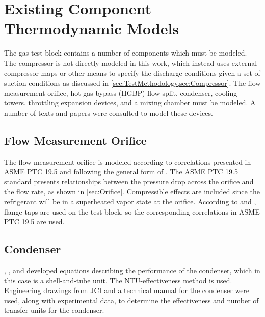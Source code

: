 
\section{Existing Component Thermodynamic Models}
The  gas test block contains a number of components which must be modeled. 
The compressor is not directly modeled in this work, 
which instead uses external compressor maps or other means 
to specify the discharge conditions given a set of suction conditions
as discussed in \cref{sec:TestMethodology,sec:Compressor}. 
The flow measurement orifice, hot gas bypass (HGBP) flow split, condenser, cooling towers, 
throttling expansion devices, and a mixing chamber must be modeled. 
A number of texts and papers were consulted to model these devices.

\subsection{Flow Measurement Orifice}
The flow measurement orifice is modeled according to correlations presented in 
ASME PTC 19.5 \citep{ptc19} and following the general form of \citet{munson2009}. 
The ASME PTC 19.5 standard presents relationships between 
the pressure drop across the orifice and the flow rate, as shown in \cref{sec:Orifice}. 
Compressible effects are included since the refrigerant will be in a 
superheated vapor state at the orifice.
According to \citet{trevino2012} and \citet{flow1984}, flange taps
are used on the test block, so the corresponding correlations in ASME PTC 19.5
are used.

\subsection{Condenser}
\citet{incropera2007}, \citet{incropera1985}, and \citet{kays1984} 
developed equations describing the performance of the condenser, 
which in this case is a shell-and-tube unit. 
The NTU-effectiveness method is used. 
Engineering drawings from JCI \citep{cond1983} and a technical manual
for the condenser \citep{condman} were used, along with experimental data,
to determine the effectiveness and number of transfer units for the condenser.

